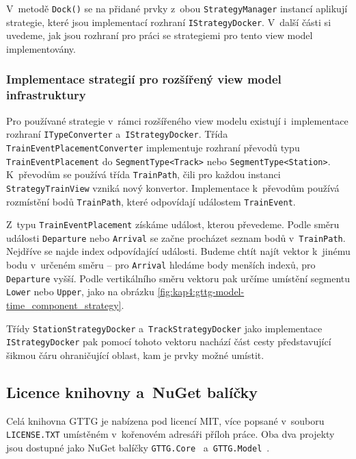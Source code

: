 \newpage
V~metodě \texttt{Dock()} se na přidané prvky z~obou \texttt{StrategyManager} instancí aplikují strategie, které jsou implementací rozhraní \texttt{IStrategyDocker}. V~další části si uvedeme, jak jsou rozhraní pro práci se strategiemi pro tento view model implementovány. 

\subsubsection*{Implementace strategií pro rozšířený view model infrastruktury}
Pro používané strategie v~rámci rozšířeného view modelu \linebreak existují i~implementace rozhraní \texttt{ITypeConverter} a~\texttt{IStrategyDocker}. Třída \texttt{TrainEventPlacementConverter} implementuje rozhraní převodů typu \linebreak \texttt{TrainEventPlacement} do \texttt{SegmentType<Track>} nebo \texttt{SegmentType<Station>}. K~převodům se používá třída \texttt{TrainPath}, čili pro každou instanci \linebreak \texttt{StrategyTrainView} vzniká nový konvertor. Implementace k~převodům používá rozmístění bodů \texttt{TrainPath}, které odpovídají událostem \texttt{TrainEvent}.

Z~typu \texttt{TrainEventPlacement} získáme událost, kterou převedeme. Podle \linebreak směru události \texttt{Departure} nebo \texttt{Arrival} se začne procházet seznam bodů \linebreak v~\texttt{TrainPath}. Nejdříve se najde index odpovídající události. Budeme chtít najít vektor k~jinému bodu v~určeném směru -- pro \texttt{Arrival} hledáme body menších indexů, pro \texttt{Departure} vyšší. Podle vertikálního směru vektoru pak určíme umístění segmentu \texttt{Lower} nebo \texttt{Upper}, jako na obrázku \ref{fig:kap4:gttg-model-time_component_strategy}.

Třídy \texttt{StationStrategyDocker} a~\texttt{TrackStrategyDocker} jako implementace \texttt{IStrategyDocker} pak pomocí tohoto vektoru nachází část cesty představující šikmou čáru ohraničující oblast, kam je prvky možné umístit.%

\subsection*{Licence knihovny a~NuGet balíčky}
Celá knihovna GTTG je nabízena pod licencí MIT, více popsané v~souboru \texttt{LICENSE.TXT} umístěném v~kořenovém adresáři příloh práce. Oba dva projekty jsou dostupné jako NuGet balíčky \texttt{GTTG.Core}~\cite{GTTG.Core.NuGet} a~\texttt{GTTG.Model}~\cite{GTTG.Model.NuGet}.